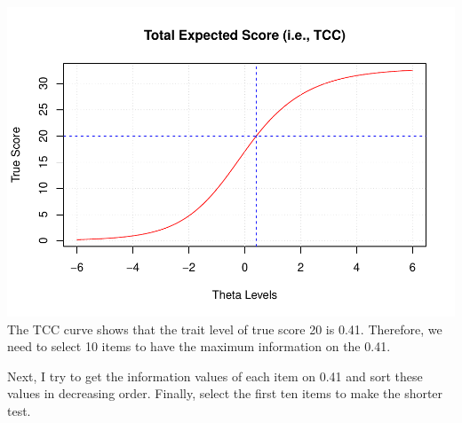 \documentclass[
]{article}
\begin{document}
\includegraphics{Assignment_4_files/figure-latex/unnamed-chunk-12-1.pdf}
The TCC curve shows that the trait level of true score 20 is 0.41.
Therefore, we need to select 10 items to have the maximum information on
the 0.41.

Next, I try to get the information values of each item on 0.41 and sort
these values in decreasing order. Finally, select the first ten items to
make the shorter test.
\end{document}
